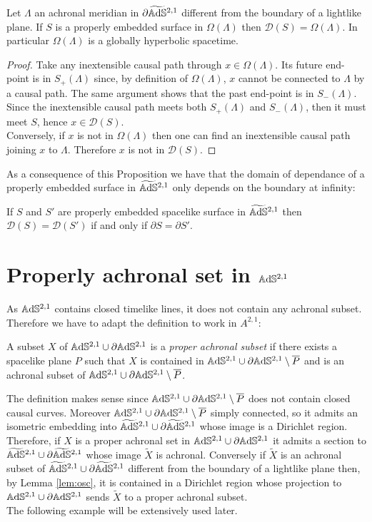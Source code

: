 \begin{proposition}
    Let $\Lambda$ an achronal meridian in $\partial\widetilde{\mathbb{A}\mathrm{d}\mathbb{S}}{}^{2,1}$ different from the boundary of a lightlike plane. If $S$ is a properly embedded surface in $\Omega(\Lambda)$ then $\mathcal{D}(S) = \Omega(\Lambda)$. In particular $\Omega(\Lambda)$ is a globally hyperbolic spacetime. 
\end{proposition}
\begin{proof}
    Take any inextensible causal path through $x\in \Omega(\Lambda)$. Its future end-point is in $S_+(\Lambda)$ since, by definition of $\Omega(\Lambda)$, $x$ cannot be connected to $\Lambda$ by a causal path. The same argument shows that the past end-point is in $S_-(\Lambda)$. Since the inextensible causal path meets both $S_+(\Lambda)$ and $S_-(\Lambda)$, then it must meet $S$, hence $x\in \mathcal{D}(S)$.\\
    Conversely, if $x$ is not in $\Omega(\Lambda)$ then one can find an inextensible causal path joining $x$ to $\Lambda$. Therefore $x$ is not in $\mathcal{D}(S)$.
\end{proof}
As a consequence of this Proposition we have that the domain of dependance of a properly embedded surface in $\widetilde{\mathbb{A}\mathrm{d}\mathbb{S}}{}^{2,1}$ only depends on the boundary at infinity:
\begin{corollary}
    If $S$ and $S'$ are properly embedded spacelike surface in $\widetilde{\mathbb{A}\mathrm{d}\mathbb{S}}{}^{2,1}$ then $\mathcal{D}(S) = \mathcal{D}(S')$ if and only if $\partial S = \partial S'$.
\end{corollary}

\section{Properly achronal set in $\mathbb{A}\mathrm{d}\mathbb{S}^{2,1}$}
As $\mathbb{A}\mathrm{d}\mathbb{S}^{2,1}$ contains closed timelike lines, it does not contain any achronal subset. Therefore we have to adapt the definition to work in $A^{2,1}$:
\begin{definition}
    A subset $X$ of $\mathbb{A}\mathrm{d}\mathbb{S}^{2,1} \cup \partial\mathbb{A}\mathrm{d}\mathbb{S}^{2,1}$ is a \textit{proper achronal subset} if there exists a spacelike plane $P$ such that $X$ is contained in $\mathbb{A}\mathrm{d}\mathbb{S}^{2,1} \cup \partial\mathbb{A}\mathrm{d}\mathbb{S}^{2,1} \setminus \overline{P}$ and is an achronal subset of $\mathbb{A}\mathrm{d}\mathbb{S}^{2,1} \cup \partial\mathbb{A}\mathrm{d}\mathbb{S}^{2,1} \setminus \overline{P}$.
\end{definition}
The definition makes sense since $\mathbb{A}\mathrm{d}\mathbb{S}^{2,1} \cup \partial\mathbb{A}\mathrm{d}\mathbb{S}^{2,1} \setminus \overline{P}$ does not contain closed causal curves. Moreover $\mathbb{A}\mathrm{d}\mathbb{S}^{2,1} \cup \partial\mathbb{A}\mathrm{d}\mathbb{S}^{2,1} \setminus \overline{P}$ simply connected, so it admits an isometric embedding into $\widetilde{\mathbb{A}\mathrm{d}\mathbb{S}}{}^{2,1} \cup \partial\widetilde{\mathbb{A}\mathrm{d}\mathbb{S}}{}^{2,1}$ whose image is a Dirichlet region. Therefore, if $X$ is a proper achronal set in $\mathbb{A}\mathrm{d}\mathbb{S}^{2,1} \cup \partial\mathbb{A}\mathrm{d}\mathbb{S}^{2,1}$ it admits a section to $\widetilde{\mathbb{A}\mathrm{d}\mathbb{S}}{}^{2,1} \cup \partial\widetilde{\mathbb{A}\mathrm{d}\mathbb{S}}{}^{2,1}$ whose image $\widetilde{X}$ is achronal. Conversely if $\widetilde{X}$ is an achronal subset of $\widetilde{\mathbb{A}\mathrm{d}\mathbb{S}}{}^{2,1} \cup \partial\widetilde{\mathbb{A}\mathrm{d}\mathbb{S}}{}^{2,1}$ different from the boundary of a lightlike plane then, by Lemma \ref{lem:osc}, it is contained in a Dirichlet region whose projection to $\mathbb{A}\mathrm{d}\mathbb{S}^{2,1} \cup \partial\mathbb{A}\mathrm{d}\mathbb{S}^{2,1}$ sends $\widetilde{X}$ to a proper achronal subset.\\
The following example will be extensively used later.

